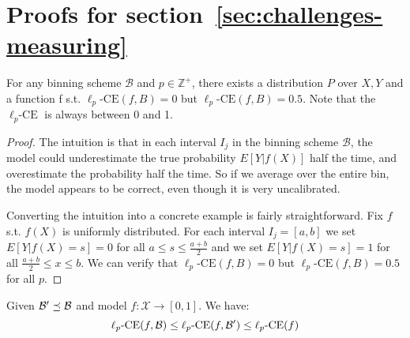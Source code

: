 \section{Proofs for section~\ref{sec:challenges-measuring}}

\begin{example}
For any binning scheme $\mathcal{B}$ and $p \in \mathbb{Z}^+$, there exists a distribution $P$ over $X, Y$ and a function f s.t. $\ell_p\mbox{-CE}(f, B) = 0$ but $\ell_p\mbox{-CE}(f, B) = 0.5$. Note that the $\ell_p\mbox{-CE}$ is always between 0 and 1.
\end{example}

\begin{proof}
The intuition is that in each interval $I_j$ in the binning scheme $\mathcal{B}$, the model could underestimate the true probability $E[Y | f(X)]$ half the time, and overestimate the probability half the time. So if we average over the entire bin, the model appears to be correct, even though it is very uncalibrated.

Converting the intuition into a concrete example is fairly straightforward. Fix $f$ s.t. $f(X)$ is uniformly distributed. For each interval $I_j = [a, b]$ we set $E[Y | f(X) = s] = 0$ for all $a \leq s \leq \frac{a+b}{2}$ and we set $E[Y | f(X) = s] = 1$ for all $\frac{a+b}{2} \leq x \leq b$. We can verify that $\ell_p\mbox{-CE}(f, B) = 0$ but $\ell_p\mbox{-CE}(f, B) = 0.5$ for all $p$.
\end{proof}


\begin{proposition}
Given $\mathcal{B}{}' \preceq \mathcal{B}{}$ and model $f : \mathcal{X} \to [0, 1]$. We have:
\[  \ell_p\mbox{-CE}(f, \mathcal{B}{}) \leq \ell_p\mbox{-CE}(f, \mathcal{B}{}') \leq \ell_p\mbox{-CE}(f) \]
\end{proposition}

